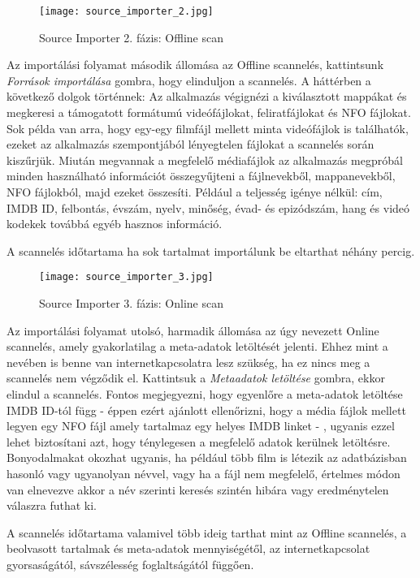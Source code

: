 \begin{figure}[H]
	\centering
	\texttt{[image: source\_importer\_2.jpg]}
	\caption{Source Importer 2. fázis: Offline scan}
	\label{fig:source_importer}
\end{figure}
Az importálási folyamat második állomása az Offline scannelés, kattintsunk {\it Források importálása} gombra, hogy elinduljon a scannelés. A háttérben a következő dolgok történnek: Az alkalmazás végignézi a kiválasztott mappákat és megkeresi a támogatott formátumú videófájlokat, feliratfájlokat és NFO fájlokat. Sok példa van arra, hogy egy-egy filmfájl mellett minta videófájlok is találhatók, ezeket az alkalmazás szempontjából lényegtelen fájlokat a scannelés során kiszűrjük. Miután megvannak a megfelelő médiafájlok az alkalmazás megpróbál minden használható információt összegyűjteni a fájlnevekből, mappanevekből, NFO fájlokból, majd ezeket összesíti. Például a teljesség igénye nélkül: cím, IMDB ID, felbontás, évszám, nyelv, minőség, évad- és epizódszám, hang és videó kodekek továbbá egyéb hasznos információ.

A scannelés időtartama ha sok tartalmat importálunk be eltarthat néhány percig.

\begin{figure}[H]
	\centering
	\texttt{[image: source\_importer\_3.jpg]}
	\caption{Source Importer 3. fázis: Online scan}
	\label{fig:source_importer}
\end{figure}
Az importálási folyamat utolsó, harmadik állomása az úgy nevezett Online scannelés, amely gyakorlatilag a meta-adatok letöltését jelenti. Ehhez mint a nevében is benne van internetkapcsolatra lesz szükség, ha ez nincs meg a scannelés nem végződik el. Kattintsuk a {\it Metaadatok letöltése} gombra, ekkor elindul a scannelés. Fontos megjegyezni, hogy egyenlőre a meta-adatok letöltése IMDB ID-tól függ - éppen ezért ajánlott ellenőrizni, hogy a média fájlok mellett legyen egy NFO fájl amely tartalmaz egy helyes IMDB linket - , ugyanis ezzel lehet biztosítani azt, hogy ténylegesen a megfelelő adatok kerülnek letöltésre. Bonyodalmakat okozhat ugyanis, ha például több film is létezik az adatbázisban hasonló vagy ugyanolyan névvel, vagy ha a fájl nem megfelelő, értelmes módon van elnevezve akkor a név szerinti keresés szintén hibára vagy eredménytelen válaszra futhat ki.

A scannelés időtartama valamivel több ideig tarthat mint az Offline scannelés, a beolvasott tartalmak és meta-adatok mennyiségétől, az internetkapcsolat gyorsaságától, sávszélesség foglaltságától függően.

